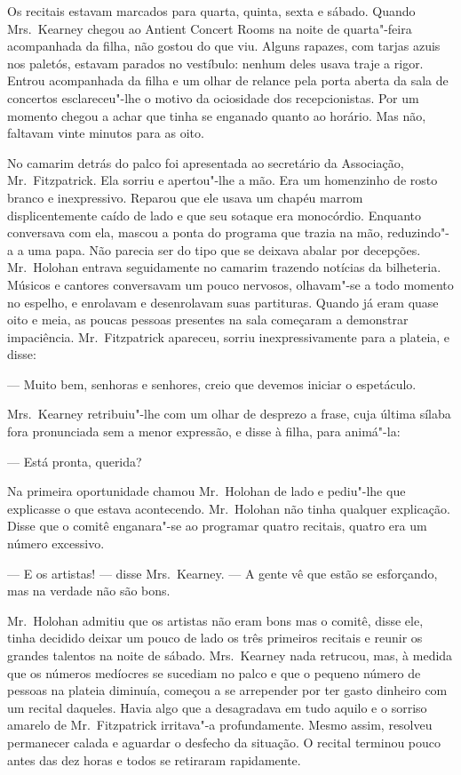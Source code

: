 Os recitais estavam marcados para quarta, quinta, sexta e sábado.  Quando 
Mrs.~Kearney chegou ao Antient Concert Rooms na noite de quarta"-feira acompanhada da
filha, não gostou do que viu.  Alguns rapazes, com tarjas azuis nos paletós,
estavam parados no vestíbulo: nenhum deles usava traje a rigor.  Entrou
acompanhada da filha e um olhar de relance pela porta aberta da sala de
concertos esclareceu"-lhe o motivo da ociosidade dos recepcionistas.  Por um
momento chegou a achar que tinha se enganado quanto ao horário.  Mas não,
faltavam vinte minutos para as oito.

No camarim detrás do palco foi apresentada ao secretário da Associação, Mr.~Fitzpatrick.  
Ela sorriu e apertou"-lhe a mão.  Era um homenzinho de rosto
branco e inexpressivo.  Reparou que ele usava um chapéu marrom displicentemente
caído de lado e que seu sotaque era monocórdio.  Enquanto conversava com ela,
mascou a ponta do programa que trazia na mão, reduzindo"-a a uma papa.  Não
parecia ser do tipo que se deixava abalar por decepções.  Mr.~Holohan entrava
seguidamente no camarim trazendo notícias da bilheteria.  Músicos e cantores
conversavam um pouco nervosos, olhavam"-se a todo momento no espelho, e
enrolavam e desenrolavam suas partituras.  Quando já eram quase oito e meia, as
poucas pessoas presentes na sala começaram a demonstrar impaciência.  
Mr.~Fitzpatrick apareceu, sorriu inexpressivamente para a plateia, e disse:

--- Muito bem, senhoras e senhores, creio que devemos iniciar o espetáculo.

Mrs.~Kearney retribuiu"-lhe com um olhar de desprezo a frase, cuja última sílaba
fora pronunciada sem a menor expressão, e disse à filha, para animá"-la:

--- Está pronta, querida?

Na primeira oportunidade chamou Mr.~Holohan de lado e pediu"-lhe que explicasse
o que estava acontecendo.  Mr.~Holohan não tinha qualquer explicação.  Disse
que o comitê enganara"-se ao programar quatro recitais, quatro era um número
excessivo.

--- E os artistas! --- disse Mrs.~Kearney.  --- A gente vê que estão se
esforçando, mas na verdade não são bons.

Mr.~Holohan admitiu que os artistas não eram bons mas o comitê, disse ele,
tinha decidido deixar um pouco de lado os três primeiros recitais e reunir os
grandes talentos na noite de sábado.  Mrs.~Kearney nada retrucou, mas, à medida
que os números medíocres se sucediam no palco e que o pequeno número de pessoas
na plateia diminuía, começou a se arrepender por ter gasto dinheiro com um
recital daqueles.  Havia algo que a desagradava em tudo aquilo e o sorriso
amarelo de Mr.~Fitzpatrick irritava"-a profundamente.  Mesmo assim, resolveu
permanecer calada e aguardar o desfecho da situação.  O recital terminou pouco
antes das dez horas e todos se retiraram rapidamente.

